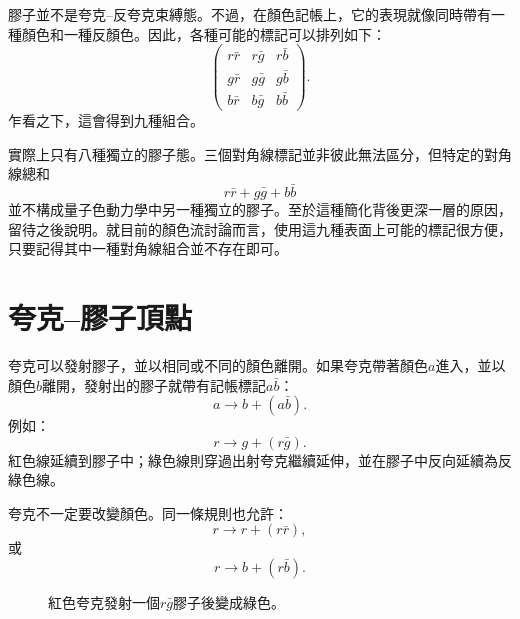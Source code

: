 膠子並不是夸克--反夸克束縛態。不過，在顏色記帳上，它的表現就像同時帶有一種顏色和一種反顏色。因此，各種可能的標記可以排列如下：
\begin{equation}
\begin{pmatrix}
r\bar r&r\bar g&r\bar b\\
g\bar r&g\bar g&g\bar b\\
b\bar r&b\bar g&b\bar b
\end{pmatrix}.
\end{equation}
乍看之下，這會得到九種組合。

\begin{classroomqa}
\end{classroomqa}

實際上只有八種獨立的膠子態。三個對角線標記並非彼此無法區分，但特定的對角線總和
\begin{equation}
r\bar r+g\bar g+b\bar b
\end{equation}
並不構成量子色動力學中另一種獨立的膠子。至於這種簡化背後更深一層的原因，留待之後說明。就目前的顏色流討論而言，使用這九種表面上可能的標記很方便，只要記得其中一種對角線組合並不存在即可。

\section{夸克--膠子頂點}

夸克可以發射膠子，並以相同或不同的顏色離開。如果夸克帶著顏色\(a\)進入，並以顏色\(b\)離開，發射出的膠子就帶有記帳標記\(a\bar b\)：
\begin{equation}
a\longrightarrow b+(a\bar b).
\end{equation}
例如：
\begin{equation}
r\longrightarrow g+(r\bar g).
\end{equation}
紅色線延續到膠子中；綠色線則穿過出射夸克繼續延伸，並在膠子中反向延續為反綠色線。

夸克不一定要改變顏色。同一條規則也允許：
\begin{equation}
r\longrightarrow r+(r\bar r),
\end{equation}
或
\begin{equation}
r\longrightarrow b+(r\bar b).
\end{equation}

\begin{figure}[h]
\centering
{}
\caption{紅色夸克發射一個\(r\bar g\)膠子後變成綠色。}
\end{figure}

